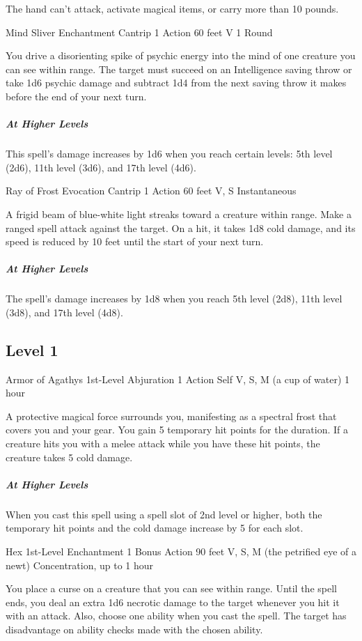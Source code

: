 {The hand can't attack, activate magical items, or carry more than 10 pounds.

\DndSpellHeader
	{Mind Sliver}
	{Enchantment Cantrip}
	{1 Action}
	{60 feet}
	{V}
	{1 Round}

You drive a disorienting spike of psychic energy into the mind of one creature you can see within range. The target must succeed on an Intelligence saving throw or take 1d6 psychic damage and subtract 1d4 from the next saving throw it makes before the end of your next turn.

\subparagraph*{At Higher Levels} This spell’s damage increases by 1d6 when you reach certain levels: 5th level (2d6), 11th level (3d6), and 17th level (4d6).

\DndSpellHeader
	{Ray of Frost}
	{Evocation Cantrip}
	{1 Action}
	{60 feet}
	{V, S}
	{Instantaneous}

A frigid beam of blue-white light streaks toward a creature within range. Make a ranged spell attack against the target. On a hit, it takes 1d8 cold damage, and its speed is reduced by 10 feet until the start of your next turn.

\subparagraph*{At Higher Levels} The spell’s damage increases by 1d8 when you reach 5th level (2d8), 11th level (3d8), and 17th level (4d8).

\subsection*{Level 1}

\DndSpellHeader
	{Armor of Agathys}
	{1st-Level Abjuration}
	{1 Action}
	{Self}
	{V, S, M (a cup of water)}
	{1 hour}

A protective magical force surrounds you, manifesting as a spectral frost that covers you and your gear. You gain 5 temporary hit points for the duration. If a creature hits you with a melee attack while you have these hit points, the creature takes 5 cold damage.

\subparagraph*{At Higher Levels} When you cast this spell using a spell slot of 2nd level or higher, both the temporary hit points and the cold damage increase by 5 for each slot.

\DndSpellHeader
	{Hex}
	{1st-Level Enchantment}
	{1 Bonus Action}
	{90 feet}
	{V, S, M (the petrified eye of a newt)}
	{Concentration, up to 1 hour}

You place a curse on a creature that you can see within range. Until the spell ends, you deal an extra 1d6 necrotic damage to the target whenever you hit it with an attack. Also, choose one ability when you cast the spell. The target has disadvantage on ability checks made with the chosen ability.

}
